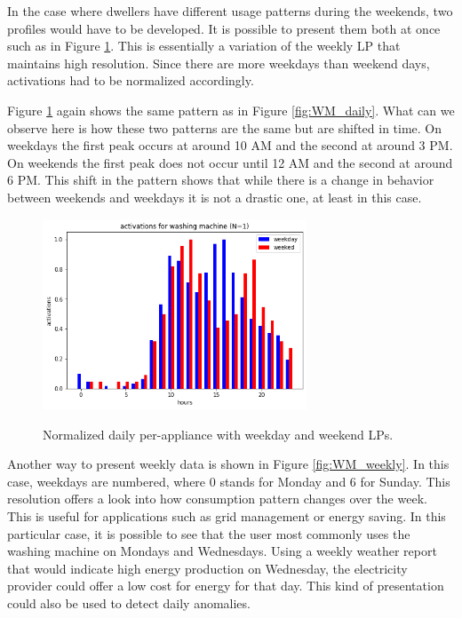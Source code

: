 In the case where dwellers have different usage patterns during the weekends, two profiles would have to be developed.
It is possible to present them both at once such as in Figure \ref{fig:WM_ww_daily}. 
This is essentially a variation of the weekly LP that maintains high resolution.
Since there are more weekdays than weekend days, activations had to be normalized accordingly.

Figure \ref{fig:WM_ww_daily} again shows the same pattern as in Figure \ref{fig:WM_daily}.
What can we observe here is how these two patterns are the same but are shifted in time. 
On weekdays the first peak occurs at around 10 AM and the second at around 3 PM.
On weekends the first peak does not occur until 12 AM and the second at around 6 PM.
This shift in the pattern shows that while there is a change in behavior between weekends and weekdays it is not a
drastic one, at least in this case. 

\begin{figure}[H]
	\centering
	\caption{Normalized daily per-appliance with weekday and weekend LPs.}
	\includegraphics[width=0.7\textwidth]{../Figures/LPS/WM_ww_daily.png}
	\label{fig:WM_ww_daily}
\end{figure}

Another way to present weekly data is shown in Figure \ref{fig:WM_weekly}.
In this case, weekdays are numbered, where 0 stands for Monday and 6 for Sunday.
This resolution offers a look into how consumption pattern changes over the week. 
This is useful for applications such as grid management or energy saving.
In this particular case, it is possible to see that the user most commonly uses the washing machine on Mondays and Wednesdays.
Using a weekly weather report that would indicate high energy production on Wednesday, the electricity provider could offer a low cost for energy for that day. 
This kind of presentation could also be used to detect daily anomalies.

